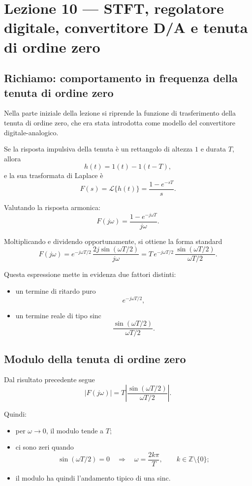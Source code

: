 \chapter{Lezione 10 --- STFT, regolatore digitale, convertitore D/A e tenuta di ordine zero}

\section{Richiamo: comportamento in frequenza della tenuta di ordine zero}

Nella parte iniziale della lezione si riprende la funzione di trasferimento della
tenuta di ordine zero, che era stata introdotta come modello del convertitore
digitale-analogico.

Se la risposta impulsiva della tenuta è un rettangolo di altezza \(1\) e durata \(T\),
allora
\[
h(t)=1(t)-1(t-T),
\]
e la sua trasformata di Laplace è
\[
F(s)=\mathcal{L}\{h(t)\}
=
\frac{1-e^{-sT}}{s}.
\]

Valutando la risposta armonica:
\[
F(j\omega)=\frac{1-e^{-j\omega T}}{j\omega}.
\]

Moltiplicando e dividendo opportunamente, si ottiene la forma standard
\[
F(j\omega)
=
e^{-j\omega T/2}\,\frac{2j\sin(\omega T/2)}{j\omega}
=
T\,e^{-j\omega T/2}\,\frac{\sin(\omega T/2)}{\omega T/2}.
\]

Questa espressione mette in evidenza due fattori distinti:
\begin{itemize}
    \item un termine di ritardo puro
    \[
    e^{-j\omega T/2},
    \]
    \item un termine reale di tipo sinc
    \[
    \frac{\sin(\omega T/2)}{\omega T/2}.
    \]
\end{itemize}

\section{Modulo della tenuta di ordine zero}

Dal risultato precedente segue
\[
|F(j\omega)|=
T\left|\frac{\sin(\omega T/2)}{\omega T/2}\right|.
\]

Quindi:
\begin{itemize}
    \item per \(\omega\to 0\), il modulo tende a \(T\);
    \item ci sono zeri quando
    \[
    \sin(\omega T/2)=0
    \quad\Longrightarrow\quad
    \omega=\frac{2k\pi}{T},\qquad k\in\mathbb{Z}\setminus\{0\};
    \]
    \item il modulo ha quindi l'andamento tipico di una sinc.
\end{itemize}

